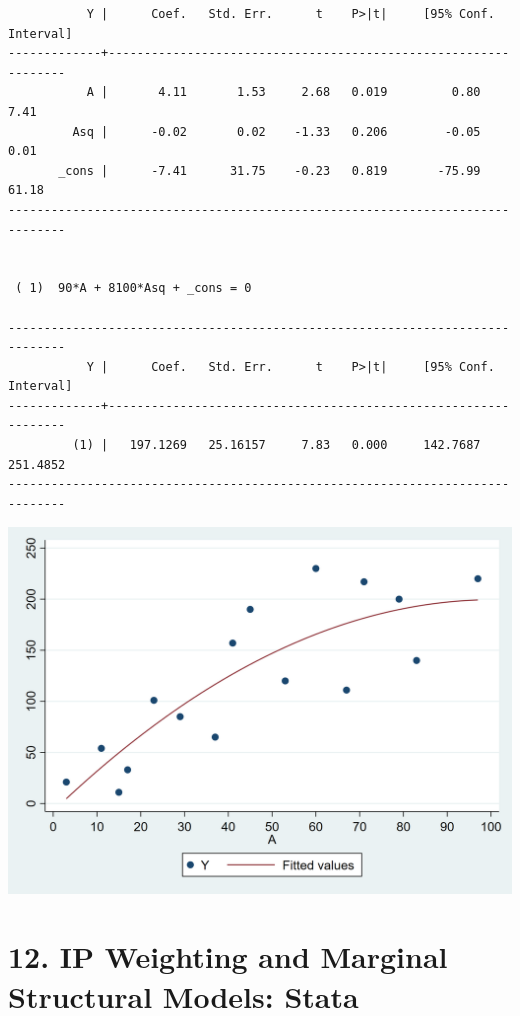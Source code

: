 \documentclass[
  10pt,
]{book}
\begin{document}
\begin{verbatim}
           Y |      Coef.   Std. Err.      t    P>|t|     [95% Conf. Interval]
-------------+----------------------------------------------------------------
           A |       4.11       1.53     2.68   0.019         0.80        7.41
         Asq |      -0.02       0.02    -1.33   0.206        -0.05        0.01
       _cons |      -7.41      31.75    -0.23   0.819       -75.99       61.18
------------------------------------------------------------------------------


 ( 1)  90*A + 8100*Asq + _cons = 0

------------------------------------------------------------------------------
           Y |      Coef.   Std. Err.      t    P>|t|     [95% Conf. Interval]
-------------+----------------------------------------------------------------
         (1) |   197.1269   25.16157     7.83   0.000     142.7687    251.4852
------------------------------------------------------------------------------
\end{verbatim}

\begin{center}\includegraphics[width=0.85\linewidth]{figs/stata-fig-11-5} \end{center}

\hypertarget{ip-weighting-and-marginal-structural-models-stata}{%
\chapter*{12. IP Weighting and Marginal Structural Models: Stata}\label{ip-weighting-and-marginal-structural-models-stata}}
\end{document}
